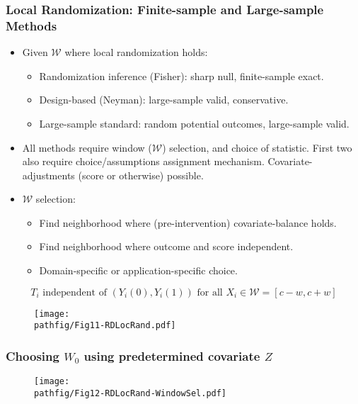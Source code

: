\documentclass[9pt]{beamer}
\renewcommand{\c}{c}
\newcommand{\W}{\mathcal{W}}
\newcommand{\pathfig}{figures}
\begin{document}
\begin{frame}\frametitle{Local Randomization: Finite-sample and Large-sample Methods}
	\begin{itemize}
		\item Given $\W$ where local randomization holds:\medskip
		\begin{itemize}
		\item Randomization inference (Fisher): sharp null, finite-sample exact.\medskip
		\item Design-based (Neyman): large-sample valid, conservative.\medskip
		\item Large-sample standard: random potential outcomes, large-sample valid.\bigskip
		\end{itemize}
		
		\item All methods require window ($\W$) selection, and choice of statistic.\smallskip\newline
		      First two also require choice/assumptions assignment mechanism.\smallskip\newline
		      Covariate-adjustments (score or otherwise) possible.\bigskip
		
		\item $\W$ selection:\medskip
		\begin{itemize}
			\item Find neighborhood where (pre-intervention) covariate-balance holds.\medskip
			\item Find neighborhood where outcome and score independent.\medskip
			\item Domain-specific or application-specific choice.
		\end{itemize}
		
	\end{itemize}
\end{frame}

\begin{frame}
	\[ T_i \text{ independent of } (Y_i(0),Y_i(1)) \text{ for all } X_i\in\W=[\c-w,c+w] \]
	\begin{figure}
		\vspace{-0.1in}
		\centering
		\texttt{[image: \\pathfig/Fig11-RDLocRand.pdf]}
	\end{figure}
\end{frame}

\begin{frame}
	\frametitle{Choosing $W_0$ using predetermined covariate $Z$}
	\begin{figure}
		\centering
		\texttt{[image: \\pathfig/Fig12-RDLocRand-WindowSel.pdf]}
	\end{figure}
\end{frame}
\end{document}
